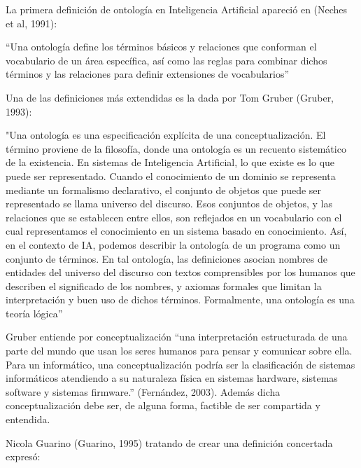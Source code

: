 La primera definición de ontología en Inteligencia Artificial apareció en (Neches et al, 1991):

“Una ontología define los términos básicos y relaciones que conforman el vocabulario de un área específica, así como las reglas para combinar dichos términos y las  relaciones para definir extensiones de vocabularios”

Una de las definiciones más extendidas es la dada por Tom Gruber (Gruber, 1993): 

 "Una ontología es una especificación explícita de una conceptualización. El término       proviene de la filosofía, donde una ontología es un recuento sistemático de la existencia. En sistemas de Inteligencia Artificial, lo que existe es lo que puede ser representado. Cuando el conocimiento de un dominio se representa mediante un formalismo declarativo, el conjunto de objetos que puede ser representado se llama universo del discurso. Esos conjuntos de objetos, y las relaciones que se establecen entre ellos, son reflejados en un vocabulario con el cual representamos el conocimiento en un sistema basado en conocimiento. Así, en el contexto de IA, podemos describir la ontología de un programa como un conjunto de términos. En tal ontología, las definiciones asocian nombres de entidades del universo del discurso con textos comprensibles por los humanos que describen el significado de los nombres, y axiomas formales que limitan la interpretación y buen uso de dichos términos. Formalmente, una ontología es una teoría lógica”
     
Gruber entiende por conceptualización “una interpretación estructurada de una parte del mundo que usan los seres humanos para pensar y comunicar sobre ella. Para un informático, una conceptualización podría ser la clasificación de sistemas informáticos atendiendo a su naturaleza física en sistemas hardware, sistemas software y sistemas firmware.” (Fernández, 2003). Además dicha conceptualización debe ser, de alguna forma, factible de ser compartida y entendida.

Nicola Guarino (Guarino, 1995) tratando de crear una definición concertada  expresó:

